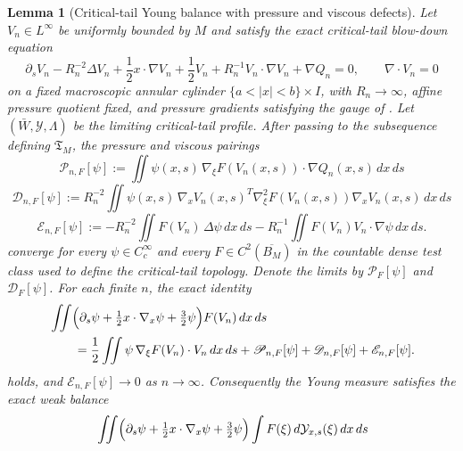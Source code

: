\documentclass[11pt]{amsart}
\numberwithin{equation}{section}
\theoremstyle{plain}
\newtheorem{lemma}[lemma]{Lemma}
\theoremstyle{definition}
\theoremstyle{remark}
\newcommand{\Tcrit}{\mathfrak T_M}
\begin{document}
\begin{lemma}[Critical-tail Young balance with pressure and viscous defects]
\label{lem:critical-tail-young-log-transport}
Let \(V_n\in L^\infty\) be uniformly bounded by \(M\) and satisfy the exact
critical-tail blow-down equation
\begin{equation}\label{eq:critical-blow-down-equation}
   \partial_s V_n
   -R_n^{-2}\Delta V_n
   +\frac12 x\cdot\nabla V_n+\frac12 V_n
   +R_n^{-1}V_n\cdot\nabla V_n+\nabla Q_n=0,
   \qquad \nabla\cdot V_n=0
\end{equation}
on a fixed macroscopic annular cylinder \(\{a<|x|<b\}\times I\), with
\(R_n\to\infty\), affine pressure quotient fixed, and pressure gradients
satisfying the gauge of
.  Let
\((\bar W,\mathcal Y,\Lambda)\) be the limiting critical-tail profile.  After
passing to the subsequence defining \(\Tcrit\), the pressure and viscous
pairings
\[
   \mathscr P_{n,F}[\psi]
   :=
   \iint \psi(x,s)\,
      \nabla_\xi F(V_n(x,s))\cdot\nabla Q_n(x,s)\,dx\,ds
\]
\[
   \mathscr D_{n,F}[\psi]
   :=
   R_n^{-2}\iint
      \psi(x,s)\,
      \nabla_xV_n(x,s)^T
      \nabla_\xi^2F(V_n(x,s))
      \nabla_xV_n(x,s)\,dx\,ds
\]
\[
   \mathscr E_{n,F}[\psi]
   :=
   -R_n^{-2}\iint F(V_n)\,\Delta\psi\,dx\,ds
   -R_n^{-1}\iint F(V_n)V_n\cdot\nabla\psi\,dx\,ds .
\]
converge for every \(\psi\in C_c^\infty\) and every
\(F\in C^2(\overline{B_M})\) in the countable dense test class used to define
the critical-tail topology.  Denote the limits by \(\mathscr P_F[\psi]\) and
\(\mathscr D_F[\psi]\).  For each finite \(n\), the exact identity
\begin{equation}\label{eq:young-transport-identity-finite-n}
\begin{aligned}
   &\iint
   \Bigl(\partial_s\psi+\tfrac12 x\cdot\nabla_x\psi+\tfrac32\psi\Bigr)
   F(V_n)\,dx\,ds\\
   &\qquad =
   \frac12\iint \psi\,\nabla_\xi F(V_n)\cdot V_n\,dx\,ds
   +\mathscr P_{n,F}[\psi]+\mathscr D_{n,F}[\psi]+\mathscr E_{n,F}[\psi].
\end{aligned}
\end{equation}
holds, and \(\mathscr E_{n,F}[\psi]\to0\) as \(n\to\infty\).  Consequently the Young measure satisfies the exact weak
balance
\begin{equation}\label{eq:young-transport-identity}
\begin{aligned}
   &\iint
   \Bigl(\partial_s\psi+\tfrac12 x\cdot\nabla_x\psi+\tfrac32\psi\Bigr)
   \int F(\xi)\,d\mathcal Y_{x,s}(\xi)\,dx\,ds\\

\end{aligned}
\end{equation}
\end{lemma}
\end{document}
